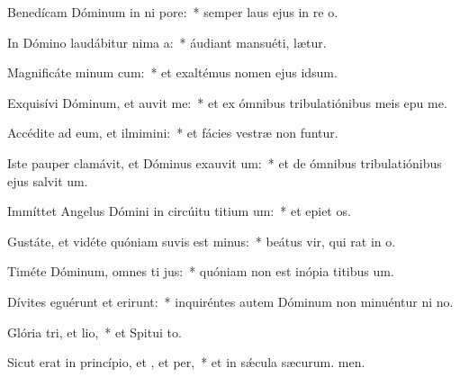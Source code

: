 \item Benedícam Dóminum in ni pore:~* semper laus ejus in re o.
\item In Dómino laudábitur nima a:~* áudiant mansuéti,  lætur.
\item Magnificáte minum cum:~* et exaltémus nomen ejus  idsum.
\item Exquisívi Dóminum, et auvit me:~* et ex ómnibus tribulatiónibus meis epu me.
\item Accédite ad eum, et ilmimini:~* et fácies vestræ non funtur.
\item Iste pauper clamávit, et Dóminus exauvit um:~* et de ómnibus tribulatiónibus ejus salvit um.
\item Immíttet Angelus Dómini in circúitu titium um:~* et epiet os.
\item Gustáte, et vidéte quóniam suvis est minus:~* beátus vir, qui rat in o.
\item Timéte Dóminum, omnes ti jus:~* quóniam non est inópia titibus um.
\item Dívites eguérunt et erirunt:~* inquiréntes autem Dóminum non minuéntur ni no.
\item Glória tri, et lio,~* et Spitui to.
\item Sicut erat in princípio, et , et per,~* et in sǽcula sæcurum. men.
